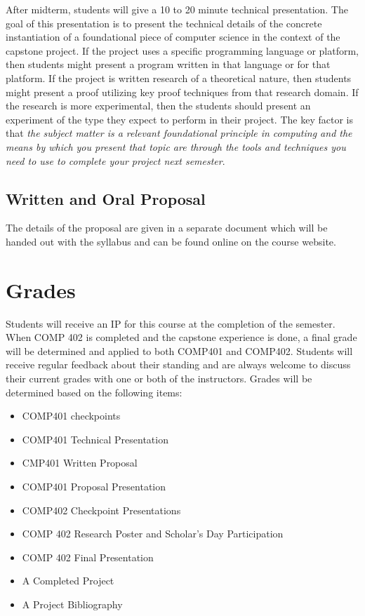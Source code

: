 \documentclass[10pt]{article}
\begin{document}
After midterm, students will give a 10 to 20 minute technical presentation.  The goal of this presentation is to present the technical details of the concrete instantiation of a foundational piece of computer science in the context of the capstone project. If the project uses a specific programming language or platform, then students might present a program written in that language or for that platform. If the project is written research of a theoretical nature, then students might present a proof utilizing key proof techniques from that research domain. If the research is more experimental, then the students should present an experiment of the type they expect to perform in their project. The key factor is that \textit{the subject matter is a relevant foundational principle in computing and the means by which you present that topic are through the tools and techniques you need to use to complete your project next semester}.


\subsection{Written and Oral Proposal}

The details of the proposal are given in a separate document which will be handed out with the syllabus and can be found online on the course website.

\section{Grades}

Students will receive an IP for this course at the completion of the semester. When COMP 402 is completed and the capstone experience is done, a final grade will be determined and applied to both COMP401 and COMP402. Students will receive regular feedback about their standing and are always welcome to discuss their current grades with one or both of the instructors. Grades will be determined based on the following items:
\begin{itemize}
\item COMP401 checkpoints
\item COMP401 Technical Presentation
\item CMP401 Written Proposal
\item COMP401 Proposal Presentation
\item COMP402 Checkpoint Presentations
\item COMP 402 Research Poster and Scholar's Day Participation
\item COMP 402 Final Presentation
\item A Completed Project
\item A Project Bibliography
\end{itemize}
\end{document}
